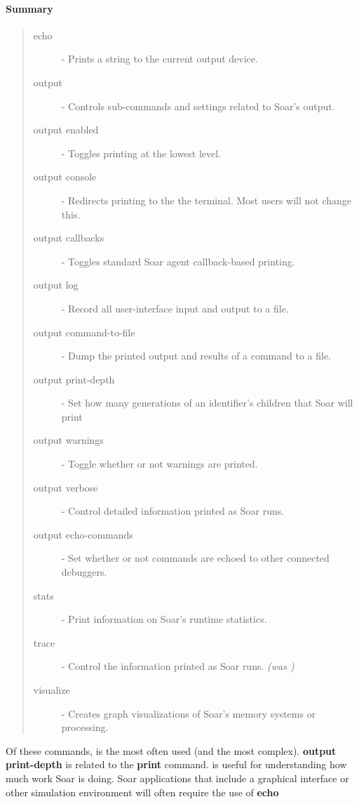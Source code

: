 \paragraph{Summary}
\begin{quote}
\begin{description}
\item[echo] - Prints a string to the current output device.
\item[output] - Controls sub-commands and settings related to Soar's output.
\item[output enabled] - Toggles printing at the lowest level.
\item[output console] - Redirects printing to the the terminal.  Most users will not change this.
\item[output callbacks] - Toggles standard Soar agent callback-based printing.
\item[output log] - Record all user-interface input and output to a file. 
\item[output command-to-file] - Dump the printed output and results of a command to a file.
\item[output print-depth] - Set how many generations of an identifier's children that Soar will print
\item[output warnings] - Toggle whether or not warnings are printed.
\item[output verbose] - Control detailed information printed as Soar runs.
\item[output echo-commands] - Set whether or not commands are echoed to other connected debuggers. 
\item[stats] - Print information on Soar's runtime statistics.
\item[trace] - Control the information printed as Soar runs. \emph{(was )}
\item[visualize] - Creates graph visualizations of Soar's memory systems or processing.
\end{description}
\end{quote}

Of these commands,  is the most often used (and the most 
complex).  \textbf{output print-depth} is related to the \textbf{print} command.  
is useful for understanding how much work Soar is doing. Soar applications that include a graphical interface or other
simulation environment will often require the use of \textbf{echo} 







